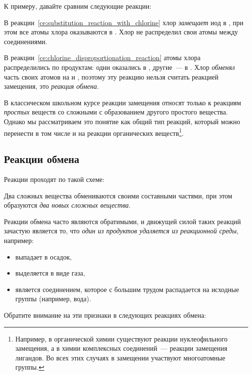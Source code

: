 К примеру, давайте сравним следующие реакции:


В реакции~\eqref{ce:substitution_reaction_with_chlorine} хлор \emph{замещает} иод в , при этом все атомы хлора оказываются в . Хлор не распределил свои атомы между соединениями.

В реакции~\eqref{ce:chlorine_disproportionation_reaction} атомы хлора распределились по продуктам: одни оказались в , другие~--- в . Хлор \emph{обменял} часть своих атомов на  и , поэтому эту реакцию нельзя считать реакцией замещения, это \emph{реакция обмена}.

В классическом школьном курсе реакции замещения относят только к реакциям \emph{простых} веществ со сложными с образованием другого простого вещества. Однако мы рассматриваем это понятие как общий тип реакций, который можно перенести в том числе и на реакции органических веществ\footnote{Например, в органической химии существуют реакции нуклеофильного замещения, а в химии комплексных соединений~--- реакции замещения лигандов. Во всех этих случаях в замещении участвуют многоатомные группы.}.

\subsection*{Реакции обмена}

Реакции проходят по такой схеме:


Два сложных вещества обмениваются своими составными частями, при этом образуются \emph{два новых сложных вещества}.

Реакции обмена часто являются обратимыми, и движущей силой таких реакций зачастую является то, что \emph{один из продуктов удаляется из реакционной среды}, например:

\begin{itemize}
    \item выпадает в осадок,
    \item выделяется в виде газа,
    \item является соединением, которое с большим трудом распадается на исходные группы (например, вода).
\end{itemize}

Обратите внимание на эти признаки в следующих реакциях обмена:


